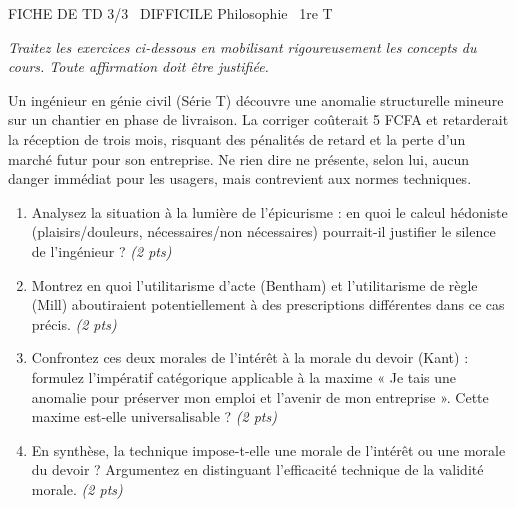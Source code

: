 \documentclass[11pt]{article}
\begin{document}
\begin{tcolorbox}[enhanced,colback=popink,colframe=popink,arc=10pt,boxrule=0pt,left=12pt,right=12pt,top=9pt,bottom=9pt]
{\color{white}\popxbold\small FICHE DE TD 3/3 \textbullet\ DIFFICILE \hfill Philosophie \textbullet\ 1re T\par}
\end{tcolorbox}
\vspace{4pt}
\noindent \textit{Traitez les exercices ci-dessous en mobilisant rigoureusement les concepts du cours. Toute affirmation doit être justifiée.}

\begin{exercice}
Un ingénieur en génie civil (Série T) découvre une anomalie structurelle mineure sur un chantier en phase de livraison. La corriger coûterait \SI{5}{\million} FCFA et retarderait la réception de trois mois, risquant des pénalités de retard et la perte d'un marché futur pour son entreprise. Ne rien dire ne présente, selon lui, aucun danger immédiat pour les usagers, mais contrevient aux normes techniques.
\begin{enumerate}
    \item Analysez la situation à la lumière de l'épicurisme : en quoi le calcul hédoniste (plaisirs/douleurs, nécessaires/non nécessaires) pourrait-il justifier le silence de l'ingénieur ? \textit{(2 pts)}
    \item Montrez en quoi l'utilitarisme d'acte (Bentham) et l'utilitarisme de règle (Mill) aboutiraient potentiellement à des prescriptions différentes dans ce cas précis. \textit{(2 pts)}
    \item Confrontez ces deux morales de l'intérêt à la morale du devoir (Kant) : formulez l'impératif catégorique applicable à la maxime « Je tais une anomalie pour préserver mon emploi et l'avenir de mon entreprise ». Cette maxime est-elle universalisable ? \textit{(2 pts)}
    \item En synthèse, la technique impose-t-elle une morale de l'intérêt ou une morale du devoir ? Argumentez en distinguant l'efficacité technique de la validité morale. \textit{(2 pts)}
\end{enumerate}
\end{exercice}
\end{document}
